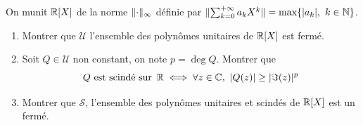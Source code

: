 \begin{exo}
    \label{evn3}
    On munit $\operatorname{\mathbb R}[X]$ de la norme $\lVert\cdot\rVert_{\infty}$ définie par $\lVert\sum_{k=0}^{+\infty}a_kX^k\rVert=\text{max}\lbrace |a_k|,\ k\in\operatorname{\mathbb N}\rbrace$.
    \begin{enumerate}
        \item Montrer que $\mathcal U$ l'ensemble des polynômes unitaires de $\operatorname{\mathbb R}[X]$ est fermé.
        \item Soit $Q\in\mathcal U$ non constant, on note $p=\deg Q$. Montrer que 
        \[Q\text{ est scindé sur }\operatorname{\mathbb R}\iff \forall z\in\operatorname{\mathbb C},\ |Q(z)|\geq |\Im(z)|^p\]
        \item Montrer que $\mathcal S$, l'ensemble des polynômes unitaires et scindés de $\operatorname{\mathbb R}[X]$ est un fermé.
    \end{enumerate}
\end{exo}

